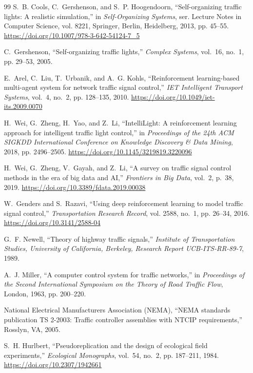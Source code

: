 \documentclass[11pt,journal,onecolumn]{article}
\begin{document}
\begin{thebibliography}{99}
S.~B. Cools, C.~Gershenson, and S.~P. Hoogendoorn, ``Self-organizing traffic lights: A realistic simulation,'' in \emph{Self-Organizing Systems}, ser. Lecture Notes in Computer Science, vol. 8221, Springer, Berlin, Heidelberg, 2013, pp. 45--55. \url{https://doi.org/10.1007/978-3-642-54124-7_5}

C.~Gershenson, ``Self-organizing traffic lights,'' \emph{Complex Systems}, vol.~16, no.~1, pp. 29--53, 2005.

E.~Arel, C.~Liu, T.~Urbanik, and A.~G. Kohls, ``Reinforcement learning-based multi-agent system for network traffic signal control,'' \emph{IET Intelligent Transport Systems}, vol.~4, no.~2, pp. 128--135, 2010. \url{https://doi.org/10.1049/iet-its.2009.0070}

H.~Wei, G.~Zheng, H.~Yao, and Z.~Li, ``IntelliLight: A reinforcement learning approach for intelligent traffic light control,'' in \emph{Proceedings of the 24th ACM SIGKDD International Conference on Knowledge Discovery \& Data Mining}, 2018, pp. 2496--2505. \url{https://doi.org/10.1145/3219819.3220096}

H.~Wei, G.~Zheng, V.~Gayah, and Z.~Li, ``A survey on traffic signal control methods in the era of big data and AI,'' \emph{Frontiers in Big Data}, vol.~2, p.~38, 2019. \url{https://doi.org/10.3389/fdata.2019.00038}

W.~Genders and S.~Razavi, ``Using deep reinforcement learning to model traffic signal control,'' \emph{Transportation Research Record}, vol. 2588, no.~1, pp. 26--34, 2016. \url{https://doi.org/10.3141/2588-04}

G.~F. Newell, ``Theory of highway traffic signals,'' \emph{Institute of Transportation Studies, University of California, Berkeley, Research Report UCB-ITS-RR-89-7}, 1989.

A.~J. Miller, ``A computer control system for traffic networks,'' in \emph{Proceedings of the Second International Symposium on the Theory of Road Traffic Flow}, London, 1963, pp. 200--220.

National Electrical Manufacturers Association (NEMA), ``NEMA standards publication TS 2-2003: Traffic controller assemblies with NTCIP requirements,'' Rosslyn, VA, 2005.

S.~H. Hurlbert, ``Pseudoreplication and the design of ecological field experiments,'' \emph{Ecological Monographs}, vol.~54, no.~2, pp. 187--211, 1984. \url{https://doi.org/10.2307/1942661}


\end{thebibliography}
\end{document}
